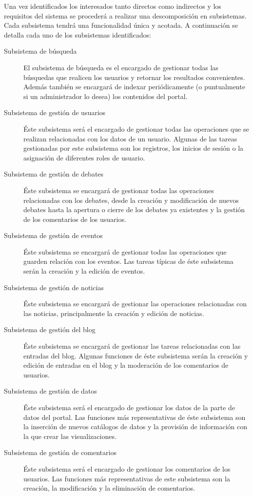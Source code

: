 Una vez identificados los interesados tanto directos como indirectos y los requisitos del sistema se procederá a realizar una descomposición en subsistemas.  Cada subsistema tendrá una funcionalidad única y acotada.\newline
A continuación se detalla cada uno de los subsistemas identificados:

\begin{description}
\item[Subsistema de búsqueda]  El subsistema de búsqueda es el encargado de gestionar todas las búsquedas que realicen los usuarios y retornar los resultados convenientes.  Además también se encargará de indexar periódicamente (o puntualmente si un administrador lo desea) los contenidos del portal.
\item[Subsistema de gestión de usuarios]  Éste subsistema será el encargado de gestionar todas las operaciones que se realizan relacionadas con los datos de un usuario.  Algunas de las tareas gestionadas por este subsistema son los registros, los inicios de sesión o la asignación de diferentes roles de usuario.
\item[Subsistema de gestión de debates]  Éste subsistema se encargará de gestionar todas las operaciones relacionadas con los debates, desde la creación y modificación de nuevos debates hasta la apertura o cierre de los debates ya existentes y la gestión de los comentarios de los usuarios.
\item[Subsistema de gestión de eventos]  Éste subsistema se encargará de gestionar todas las operaciones que guarden relación con los eventos.  Las tareas típicas de éste subsistema serán la creación y la edición de eventos.
\item[Subsistema de gestión de noticias]  Éste subsistema se encargará de gestionar las operaciones relacionadas con las noticias, principalmente la creación y edición de noticias.
\item[Subsistema de gestión del blog]  Éste subsistema se encargará de gestionar las tareas relacionadas con las entradas del blog.  Algunas funciones de éste subsistema serán la creación y edición de entradas en el blog y la moderación de los comentarios de usuarios.
\item[Subsistema de gestión de datos]  Éste subsistema será el encargado de gestionar los datos de la parte de datos del portal.  Las funciones más representativas de éste subsistema son la inserción de nuevos catálogos de datos y la provisión de información con la que crear las visualizaciones.
\item[Subsistema de gestión de comentarios]  Éste subsistema será el encargado de gestionar los comentarios de los usuarios.  Las funciones más representativas de este subsistema son la creación, la modificación y la eliminación de comentarios.
\end{description}

